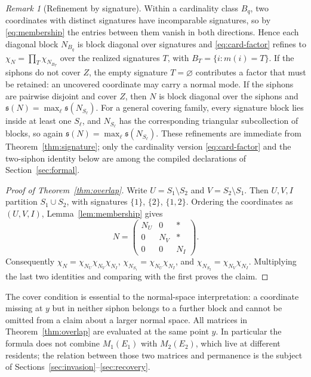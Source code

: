 \documentclass[11pt,a4paper]{article}
\theoremstyle{plain}
\theoremstyle{definition}
\theoremstyle{remark}
\newtheorem{remark}[theorem]{Remark}
\newcommand{\ch}{\chi}
\newcommand{\spb}{\mathfrak s}
\begin{document}
\begin{remark}[Refinement by signature]\label{rem:signature-refinement}
Within a cardinality class $B_q$, two coordinates with distinct signatures have incomparable signatures, so by \eqref{eq:membership} the entries between them vanish in both directions. Hence each diagonal block $N_{B_q}$ is block diagonal over signatures and \eqref{eq:card-factor} refines to $\ch_N=\prod_T\ch_{N_{B_T}}$ over the realized signatures $T$, with $B_T=\{i:m(i)=T\}$. If the siphons do not cover $Z$, the empty signature $T=\varnothing$ contributes a factor that must be retained: an uncovered coordinate may carry a normal mode. If the siphons are pairwise disjoint and cover $Z$, then $N$ is block diagonal over the siphons and $\spb(N)=\max_\ell\spb(N_{S_\ell})$. For a general covering family, every signature block lies inside at least one $S_\ell$, and $N_{S_\ell}$ has the corresponding triangular subcollection of blocks, so again $\spb(N)=\max_\ell\spb(N_{S_\ell})$. These refinements are immediate from Theorem~\ref{thm:signature}; only the cardinality version \eqref{eq:card-factor} and the two-siphon identity below are among the compiled declarations of Section~\ref{sec:formal}.
\end{remark}

\begin{proof}[Proof of Theorem~\ref{thm:overlap}]
Write $U=S_1\setminus S_2$ and $V=S_2\setminus S_1$. Then $U,V,I$ partition $S_1\cup S_2$, with signatures $\{1\}$, $\{2\}$, $\{1,2\}$. Ordering the coordinates as $(U,V,I)$, Lemma~\ref{lem:membership} gives
\begin{equation}\label{eq:triangular}
 N=\begin{pmatrix}N_U&0&*\\0&N_V&*\\0&0&N_I\end{pmatrix}.
\end{equation}
Consequently $\ch_N=\ch_{N_U}\ch_{N_V}\ch_{N_I}$, $\ch_{N_{S_1}}=\ch_{N_U}\ch_{N_I}$, and $\ch_{N_{S_2}}=\ch_{N_V}\ch_{N_I}$. Multiplying the last two identities and comparing with the first proves the claim.
\end{proof}

The cover condition is essential to the normal-space interpretation: a coordinate missing at $y$ but in neither siphon belongs to a further block and cannot be omitted from a claim about a larger normal space. All matrices in Theorem~\ref{thm:overlap} are evaluated at the same point $y$. In particular the formula does not combine $M_1(E_1)$ with $M_2(E_2)$, which live at different residents; the relation between those two matrices and permanence is the subject of Sections~\ref{sec:invasion}--\ref{sec:recovery}.
\end{document}
